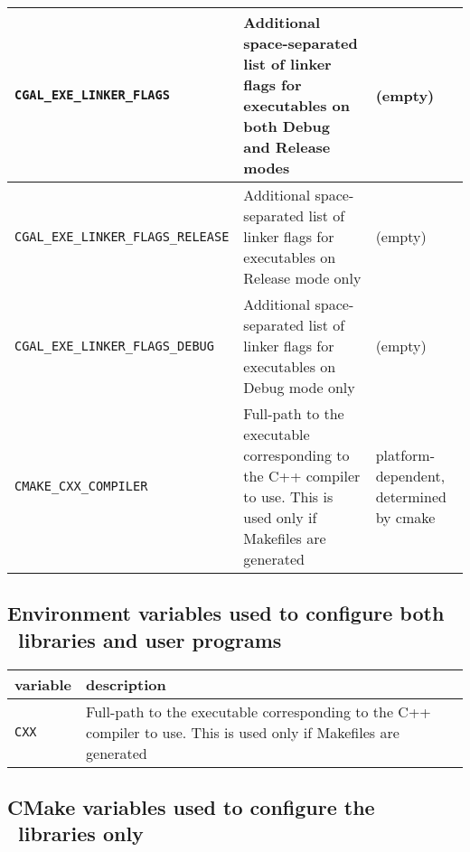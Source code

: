 \begin{center}
\begin{tabular}{|l|l|l|}
    \\\hline
    \texttt{CGAL\_EXE\_LINKER\_FLAGS} & Additional space-separated list of linker flags for executables on both Debug and Release modes & (empty)
    \\\hline
    \texttt{CGAL\_EXE\_LINKER\_FLAGS\_RELEASE} & Additional space-separated list of linker flags for executables on Release mode only & (empty)
    \\\hline
    \texttt{CGAL\_EXE\_LINKER\_FLAGS\_DEBUG} & Additional space-separated list of linker flags for executables on Debug mode only & (empty)
    \\\hline
    \texttt{CMAKE\_CXX\_COMPILER} & Full-path to the executable corresponding to the C++ compiler to use. This is used only if Makefiles are generated & platform-dependent, determined by cmake
    \\\hline
  \end{tabular}
\end{center}

\subsection{Environment variables used to configure both \cgal\ libraries and user programs}

\begin{center}
  \renewcommand{\arraystretch}{1.3}
  \gdef\lcTabularBorder{2}
  \begin{tabular}{|l|l|} \hline
    \textbf{variable}  & \textbf{description} 
    \\\hline\hline
    {\tt CXX } & Full-path to the executable corresponding to the C++ compiler to use. This is used only if Makefiles are generated
    \\\hline
  \end{tabular}
\end{center}

\subsection{CMake variables used to configure the \cgal\ libraries only}

